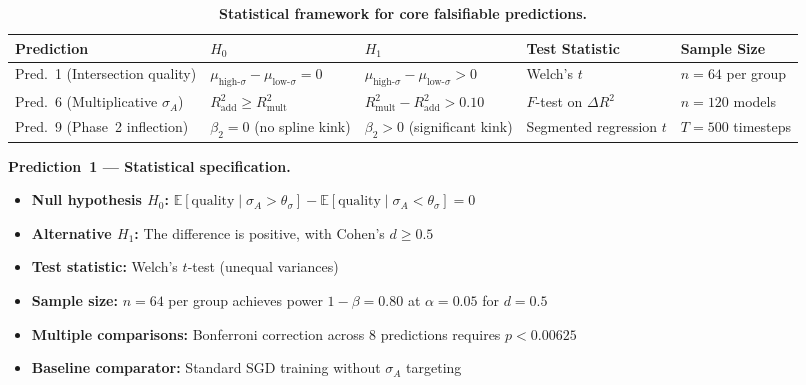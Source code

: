 \documentclass[11pt,a4paper]{article}
\begin{document}
\begin{table}[htbp]
\centering
\caption{\textbf{Statistical framework for core falsifiable predictions.}}
\label{tab:predictions-framework}
\small
\begin{tabular}{@{}l p{2.2cm} p{2.2cm} p{2.5cm} p{2.0cm}@{}}
\toprule
\textbf{Prediction} & \textbf{$H_0$} & \textbf{$H_1$} & \textbf{Test Statistic} & \textbf{Sample Size} \\
\midrule
Pred.~1 (Intersection quality) & $\mu_{\text{high-}\sigma} - \mu_{\text{low-}\sigma} = 0$ & $\mu_{\text{high-}\sigma} - \mu_{\text{low-}\sigma} > 0$ & Welch's $t$ & $n = 64$ per group \\
Pred.~6 (Multiplicative $\sigma_A$) & $R^2_{\text{add}} \geq R^2_{\text{mult}}$ & $R^2_{\text{mult}} - R^2_{\text{add}} > 0.10$ & $F$-test on $\Delta R^2$ & $n = 120$ models \\
Pred.~9 (Phase~2 inflection) & $\beta_2 = 0$ (no spline kink) & $\beta_2 > 0$ (significant kink) & Segmented regression $t$ & $T = 500$ timesteps \\
\bottomrule
\end{tabular}
\end{table}

\textbf{Prediction~1 --- Statistical specification.}
\begin{itemize}[nosep]
\item \textbf{Null hypothesis $H_0$:} $\mathbb{E}[\text{quality} \mid \sigma_A > \theta_\sigma] - \mathbb{E}[\text{quality} \mid \sigma_A < \theta_\sigma] = 0$
\item \textbf{Alternative $H_1$:} The difference is positive, with Cohen's $d \geq 0.5$
\item \textbf{Test statistic:} Welch's $t$-test (unequal variances)
\item \textbf{Sample size:} $n = 64$ per group achieves power $1 - \beta = 0.80$ at $\alpha = 0.05$ for $d = 0.5$
\item \textbf{Multiple comparisons:} Bonferroni correction across 8 predictions requires $p < 0.00625$
\item \textbf{Baseline comparator:} Standard SGD training without $\sigma_A$ targeting
\end{itemize}
\end{document}
